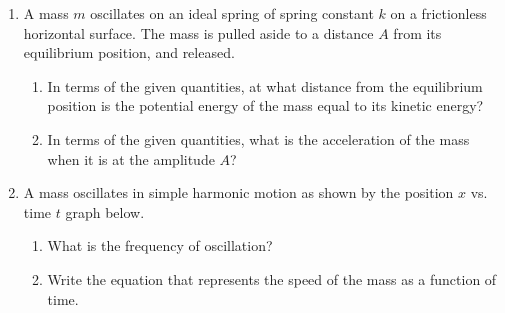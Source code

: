 \documentclass{../../oss-apphys}
\begin{document}
\begin{enumerate}[leftmargin=15pt]

\item A mass $m$ oscillates on an ideal spring of spring constant $k$ on a
  frictionless horizontal surface. The mass is pulled aside to a distance $A$
  from its equilibrium position, and released.
  \begin{center}
  \end{center} 
  \begin{enumerate}[noitemsep]  
  \item\vspace{-.15in} In terms of the given quantities, at what distance from
    the equilibrium
    position is the potential energy of the mass equal to its kinetic energy?
  \item In terms of the given quantities, what is the acceleration of the mass
    when it is at the amplitude $A$?
  \end{enumerate}
  \vspace{1.6in}
  
\item A mass oscillates in simple harmonic motion as shown by the position $x$
  vs. time $t$ graph below.
  \begin{center}
    \vspace{-.1in}
  \end{center}
  \begin{enumerate}[noitemsep]  
  \item What is the frequency of oscillation?
  \item Write the equation that represents the speed of the mass as a function
    of time.
  \end{enumerate}
  \newpage


\end{enumerate}
\end{document}
